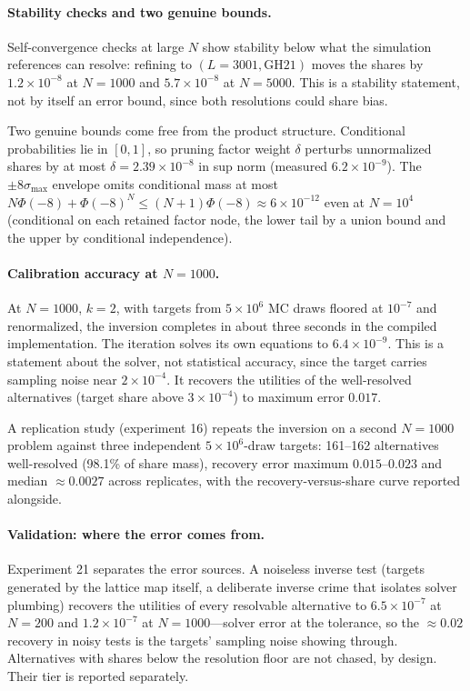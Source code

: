\documentclass[12pt]{article}
\theoremstyle{remark}
\begin{document}
\paragraph{Stability checks and two genuine bounds.} Self-convergence
checks at large $N$ show stability below what the
simulation references can resolve: refining to $(L = 3001, \mathrm{GH}21)$
moves the shares by $1.2\times10^{-8}$ at $N=1000$ and
$5.7\times10^{-8}$ at $N=5000$. This is a stability statement, not by
itself an error bound, since both resolutions could share bias.

Two genuine bounds
come free from the product structure. Conditional probabilities lie in
$[0,1]$, so pruning factor weight $\delta$ perturbs unnormalized shares by
at most $\delta = 2.39\times10^{-8}$ in sup norm (measured
$6.2\times10^{-9}$). The $\pm8\sigma_{\max}$ envelope omits
conditional mass at most $N\Phi(-8) + \Phi(-8)^N \le (N+1)\Phi(-8)
\approx 6\times10^{-12}$ even at $N = 10^4$ (conditional on each retained factor node, the lower tail by a union
bound and the upper by conditional independence).

\paragraph{Calibration accuracy at $N=1000$.}

At $N=1000$, $k=2$, with targets from
$5\times10^6$ MC draws floored at $10^{-7}$ and renormalized, the inversion
completes in about three seconds in the compiled implementation. The
iteration solves its own equations
to $6.4\times10^{-9}$. This is a statement about the solver, not
statistical accuracy, since the target carries sampling noise near
$2\times10^{-4}$. It recovers the utilities
of the well-resolved alternatives (target share above $3\times10^{-4}$)
to maximum error $0.017$.

A replication study (experiment
16) repeats the inversion on a second $N=1000$ problem against three
independent $5\times10^6$-draw targets: 161--162
alternatives well-resolved (98.1\% of share mass), recovery error maximum
$0.015$--$0.023$ and median $\approx 0.0027$ across replicates, with the
recovery-versus-share curve reported alongside.

\paragraph{Validation: where the error comes from.} Experiment 21
separates the error sources. A noiseless inverse
test (targets generated by the lattice map itself, a deliberate inverse
crime that isolates solver plumbing) recovers the utilities of every
resolvable alternative to $6.5\times10^{-7}$ at $N=200$ and
$1.2\times10^{-7}$ at $N=1000$---solver error at the tolerance, so the
$\approx 0.02$ recovery in noisy tests is the targets' sampling noise
showing through. Alternatives with shares below the resolution floor are not
chased, by design. Their tier is reported separately.
\end{document}

